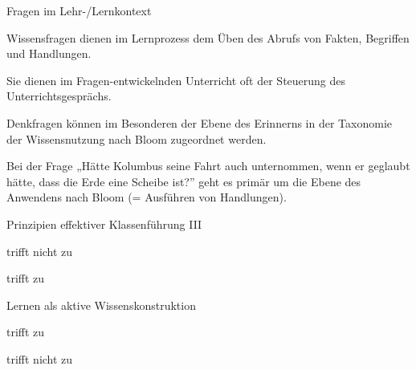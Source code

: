 
\begin{multiple-choice}{Fragen im Lehr-/Lernkontext}
    \begin{answers}
        \item[\correct] Wissensfragen dienen im Lernprozess dem Üben des Abrufs von Fakten, Begriffen und Handlungen.
        \item[\correct] Sie dienen im Fragen-entwickelnden Unterricht oft der Steuerung des Unterrichtsgesprächs.
        \item[\wrong] Denkfragen können im Besonderen der Ebene des Erinnerns in der Taxonomie der Wissensnutzung nach Bloom zugeordnet werden.
        \item[\wrong] Bei der Frage „Hätte Kolumbus seine Fahrt auch unternommen, wenn er geglaubt hätte, dass die Erde eine Scheibe ist?” geht es primär um die Ebene des Anwendens nach Bloom (= Ausführen von Handlungen).
    \end{answers}
\end{multiple-choice}

\begin{single-choice}{Prinzipien effektiver Klassenführung III}
    \begin{answers}
        \item[\correct] trifft nicht zu
        \item[\wrong] trifft zu
    \end{answers}
\end{single-choice}

\begin{single-choice}{Lernen als aktive Wissenskonstruktion}
    \begin{answers}
        \item[\correct] trifft zu
        \item[\wrong] trifft nicht zu 
    \end{answers}
\end{single-choice}

